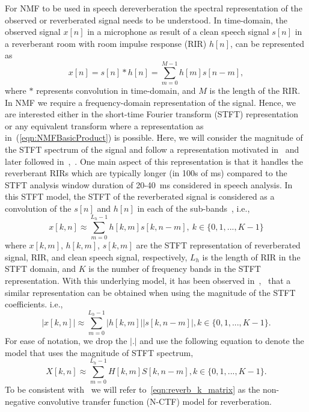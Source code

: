 For NMF to be used in speech dereverberation the spectral representation of the
observed or reverberated signal needs to be understood. In time-domain, the observed signal
$x[n]$ in a microphone as result of a clean speech signal $s[n]$ in a
reverberant room with room impulse response (RIR) $h[n]$, can be represented as
\begin{equation}
  x[n] = s[n] * h[n] = \sum_{m=0}^{M-1} h[m] s[n-m],
  \label{eqn:reverb_t}
\end{equation}
where $*$ represents convolution in time-domain, and $M$ is the length
of the RIR. In NMF we require a frequency-domain representation of the signal.
Hence, we are interested either in the short-time Fourier transform (STFT)
representation or any equivalent transform where a representation as
in~(\ref{eqn:NMFBasicProduct}) is possible. Here, we will consider the magnitude of
the STFT spectrum of the signal and follow a representation motivated
in~\cite{kameoka2009robust} and later followed
in~\cite{Kumar2011},~\cite{Mohammadiha2016}.  
One main aspect of this representation is that it handles the reverberant RIRs
which are typically longer (in 100s of ms) compared to the STFT analysis window
duration of 20-40~ms considered in speech analysis. In this STFT model, the STFT
of the reverberated signal is considered as a convolution of the $s[n]$ and
$h[n]$ in each of the sub-bands~\cite{Yekutiel2007}, \cite{kameoka2009robust} i.e.,
\begin{equation}
  x[k,n] \approx \sum_{m=0}^{L_h-1} h[k, m] s[k, n-m],\ k\in\{0,1,...,K-1\}
  \label{eqn:reverb_k}
\end{equation}
where $x[k,m]$, $h[k,m]$, $s[k,m]$ are the STFT representation of reverberated
signal, RIR, and clean speech signal, respectively, $L_h$ is the length of RIR
in the STFT domain, and $K$ is the number of frequency bands in the STFT
representation. With this underlying model, it has been observed
in~\cite{Kumar2011},~\cite{Mohammadiha2016} that a similar representation can be
obtained when using the magnitude of the STFT coefficients. i.e.,
\begin{equation}
  |x[k,n]| \approx \sum_{m=0}^{L_h-1} |h[k, m]| |s[k, n-m]|, k\in\{0,1,...,K-1\}.
  \label{eqn:reverb_k_mag}
\end{equation}
For ease of notation, we drop the $| . |$ and use the following equation to
denote the model that uses the magnitude of STFT spectrum,
\begin{equation}
   X[k,n] \approx \sum_{m=0}^{L_h-1} H[k, m] S[k, n-m], k\in\{0,1,...,K-1\}.
  \label{eqn:reverb_k_matrix}
\end{equation}
To be consistent with~\cite{Mohammadiha2016} we will refer
to~\eqref{eqn:reverb_k_matrix} as the non-negative convolutive transfer function
(N-CTF) model for reverberation.


